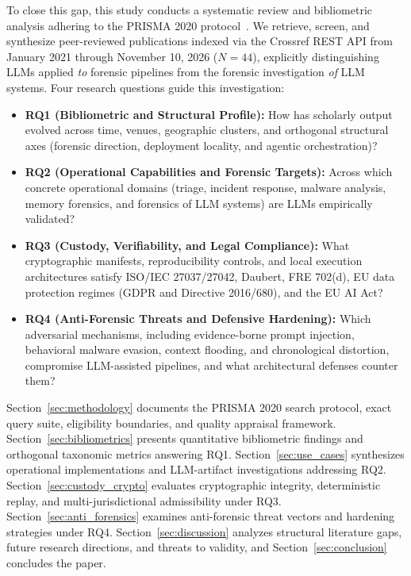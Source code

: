 To close this gap, this study conducts a systematic review and bibliometric analysis adhering to the PRISMA 2020 protocol~\cite{page2021prisma}. We retrieve, screen, and synthesize peer-reviewed publications indexed via the Crossref REST API from January 2021 through November 10, 2026 ($N=44$), explicitly distinguishing LLMs applied \textit{to} forensic pipelines from the forensic investigation \textit{of} LLM systems. Four research questions guide this investigation:
\begin{itemize}
    \item \textbf{RQ1 (Bibliometric and Structural Profile):} How has scholarly output evolved across time, venues, geographic clusters, and orthogonal structural axes (forensic direction, deployment locality, and agentic orchestration)?
    \item \textbf{RQ2 (Operational Capabilities and Forensic Targets):} Across which concrete operational domains (triage, incident response, malware analysis, memory forensics, and forensics of LLM systems) are LLMs empirically validated?
    \item \textbf{RQ3 (Custody, Verifiability, and Legal Compliance):} What cryptographic manifests, reproducibility controls, and local execution architectures satisfy ISO/IEC 27037/27042, Daubert, FRE 702(d), EU data protection regimes (GDPR and Directive 2016/680), and the EU AI Act?
    \item \textbf{RQ4 (Anti-Forensic Threats and Defensive Hardening):} Which adversarial mechanisms, including evidence-borne prompt injection, behavioral malware evasion, context flooding, and chronological distortion, compromise LLM-assisted pipelines, and what architectural defenses counter them?
\end{itemize}

Section~\ref{sec:methodology} documents the PRISMA 2020 search protocol, exact query suite, eligibility boundaries, and quality appraisal framework. Section~\ref{sec:bibliometrics} presents quantitative bibliometric findings and orthogonal taxonomic metrics answering RQ1. Section~\ref{sec:use_cases} synthesizes operational implementations and LLM-artifact investigations addressing RQ2. Section~\ref{sec:custody_crypto} evaluates cryptographic integrity, deterministic replay, and multi-jurisdictional admissibility under RQ3. Section~\ref{sec:anti_forensics} examines anti-forensic threat vectors and hardening strategies under RQ4. Section~\ref{sec:discussion} analyzes structural literature gaps, future research directions, and threats to validity, and Section~\ref{sec:conclusion} concludes the paper.
